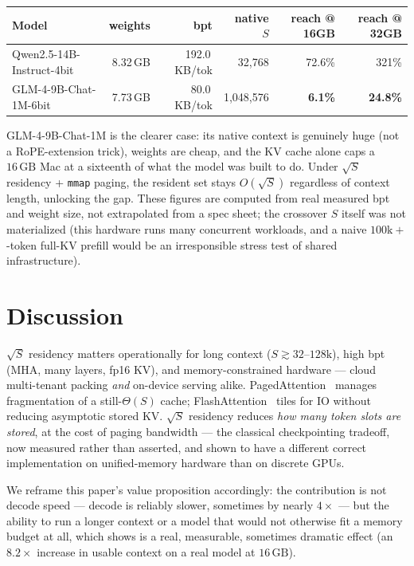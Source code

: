 \documentclass[11pt]{article}
\begin{document}
\begin{center}
\begin{tabular}{@{}lrrrrr@{}}
\toprule
Model & weights & bpt & native $S$ & reach @ 16GB & reach @ 32GB \\
\midrule
Qwen2.5-14B-Instruct-4bit & 8.32\,GB & 192.0\,KB/tok & 32{,}768 & 72.6\% & 321\% \\
GLM-4-9B-Chat-1M-6bit & 7.73\,GB & 80.0\,KB/tok & 1{,}048{,}576 & \textbf{6.1\%} & \textbf{24.8\%} \\
\bottomrule
\end{tabular}
\end{center}
GLM-4-9B-Chat-1M is the clearer case: its native context is genuinely huge
(not a RoPE-extension trick), weights are cheap, and the KV cache alone
caps a $16\,\mathrm{GB}$ Mac at a sixteenth of what the model was built to
do. Under $\sqrt{S}$ residency + \texttt{mmap} paging, the resident set
stays $O(\sqrt{S})$ regardless of context length, unlocking the gap. These
figures are computed from real measured bpt and weight size, not
extrapolated from a spec sheet; the crossover $S$ itself was not
materialized (this hardware runs many concurrent workloads, and a naive
$100\mathrm{k}{+}$-token full-KV prefill would be an irresponsible stress
test of shared infrastructure).

\section{Discussion}

$\sqrt{S}$ residency matters operationally for long context
($S\gtrsim 32$--$128\mathrm{k}$), high bpt (MHA, many layers, fp16 KV), and
memory-constrained hardware --- cloud multi-tenant packing \emph{and}
on-device serving alike. PagedAttention~\cite{kwon2023vllm} manages
fragmentation of a still-$\Theta(S)$ cache; FlashAttention~\cite{dao2022flash}
tiles for IO without reducing asymptotic stored KV. $\sqrt{S}$ residency
reduces \emph{how many token slots are stored}, at the cost of paging
bandwidth --- the classical checkpointing tradeoff, now measured rather
than asserted, and shown to have a different correct implementation on
unified-memory hardware than on discrete GPUs.

We reframe this paper's value proposition accordingly: the contribution is
not decode speed --- decode is reliably slower, sometimes by nearly $4\times$
--- but the ability to run a longer context or a model that would not
otherwise fit a memory budget at all, which  shows is a real,
measurable, sometimes dramatic effect (an $8.2\times$ increase in usable
context on a real model at $16\,\mathrm{GB}$).
\end{document}
